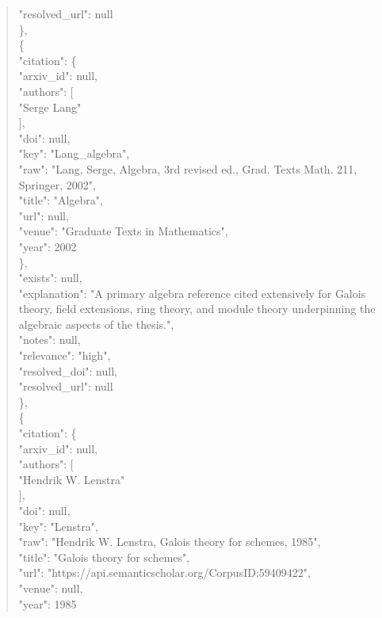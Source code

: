 \documentclass[11pt]{article}
\begin{document}
\begin{quote}
      "resolved\_url": null\\
    \},\\
    \{\\
      "citation": \{\\
        "arxiv\_id": null,\\
        "authors": [\\
          "Serge Lang"\\
        ],\\
        "doi": null,\\
        "key": "Lang\_algebra",\\
        "raw": "Lang, Serge, Algebra, 3rd revised ed., Grad. Texts Math. 211, Springer, 2002",\\
        "title": "Algebra",\\
        "url": null,\\
        "venue": "Graduate Texts in Mathematics",\\
        "year": 2002\\
      \},\\
      "exists": null,\\
      "explanation": "A primary algebra reference cited extensively for Galois theory, field extensions, ring theory, and module theory underpinning the algebraic aspects of the thesis.",\\
      "notes": null,\\
      "relevance": "high",\\
      "resolved\_doi": null,\\
      "resolved\_url": null\\
    \},\\
    \{\\
      "citation": \{\\
        "arxiv\_id": null,\\
        "authors": [\\
          "Hendrik W. Lenstra"\\
        ],\\
        "doi": null,\\
        "key": "Lenstra",\\
        "raw": "Hendrik W. Lenstra, Galois theory for schemes, 1985",\\
        "title": "Galois theory for schemes",\\
        "url": "https://api.semanticscholar.org/CorpusID:59409422",\\
        "venue": null,\\
        "year": 1985\\

\end{quote}
\end{document}
